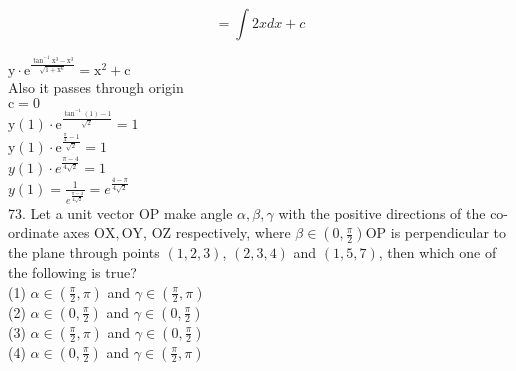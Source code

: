 \documentclass[10pt]{article}
\begin{document}
\[
=\int 2 x d x+c
\]

\(\mathrm{y} \cdot \mathrm{e}^{\frac{\tan ^{-1} \mathrm{x}^{3}-\mathrm{x}^{3}}{\sqrt{1+\mathrm{x}^{6}}}}=\mathrm{x}^{2}+\mathrm{c}\)\\
Also it passes through origin\\
\(\mathrm{c}=0\)\\
\(\mathrm{y}(1) \cdot \mathrm{e}^{\frac{\tan ^{-1}(1)-1}{\sqrt{2}}}=1\)\\
\(\mathrm{y}(1) \cdot \mathrm{e}^{\frac{\frac{\pi}{4}-1}{\sqrt{2}}}=1\)\\
\(y(1) \cdot e^{\frac{\pi-4}{4 \sqrt{2}}}=1\)\\
\(y(1)=\frac{1}{e^{\frac{\pi-4}{4 \sqrt{2}}}}=e^{\frac{4-\pi}{4 \sqrt{2}}}\)\\
73. Let a unit vector OP make angle \(\alpha, \beta, \gamma\) with the positive directions of the co-ordinate axes \(\mathrm{OX}, \mathrm{OY}\), OZ respectively, where \(\beta \in\left(0, \frac{\pi}{2}\right) \mathrm{OP}\) is perpendicular to the plane through points \((1,2,3)\), \((2,3,4)\) and \((1,5,7)\), then which one of the following is true?\\
(1) \(\alpha \in\left(\frac{\pi}{2}, \pi\right)\) and \(\gamma \in\left(\frac{\pi}{2}, \pi\right)\)\\
(2) \(\alpha \in\left(0, \frac{\pi}{2}\right)\) and \(\gamma \in\left(0, \frac{\pi}{2}\right)\)\\
(3) \(\alpha \in\left(\frac{\pi}{2}, \pi\right)\) and \(\gamma \in\left(0, \frac{\pi}{2}\right)\)\\
(4) \(\alpha \in\left(0, \frac{\pi}{2}\right)\) and \(\gamma \in\left(\frac{\pi}{2}, \pi\right)\)
\end{document}
